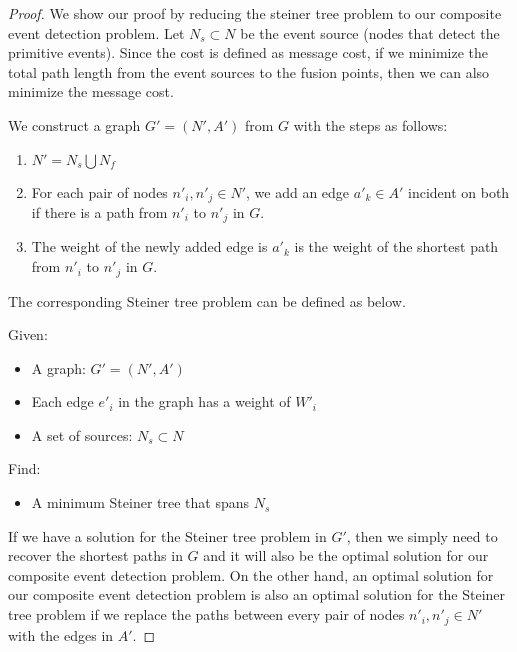 \begin{proof}
We show our proof by reducing the steiner tree problem to our composite event detection problem. Let \(N_s\subset N\) be the event source (nodes that detect the primitive events). Since the cost is defined as message cost, if we minimize the total path length from the event sources to the fusion points, then we can also minimize the message cost.

We construct a graph \(G'=(N', A')\) from \(G\) with the steps as follows:
\begin{enumerate}
\item \(N'=N_s\bigcup N_f\)
\item For each pair of nodes \(n'_i, n'_j\in N'\), we add an edge \(a'_k\in A'\) incident on both if there is a path from \(n'_i\) to \(n'_j\) in \(G\).
\item The weight of the newly added edge is \(a'_k\) is the weight of the shortest path from \(n'_i\) to \(n'_j\) in \(G\).
\end{enumerate}

The corresponding Steiner tree problem can be defined as below.

Given:
\begin{itemize}
\item A graph: \(G'=(N', A')\)
\item Each edge \(e'_i\) in the graph has a weight of \(W'_i\)
\item A set of sources: \(N_s\subset N\)
\end{itemize}

Find:
\begin{itemize}
\item A minimum Steiner tree that spans \(N_s\)
\end{itemize}

If we have a solution for the Steiner tree problem in \(G'\), then we simply need to recover the shortest paths in \(G\) and it will also be the optimal solution for our composite event detection problem. On the other hand, an optimal solution for our composite event detection problem is also an optimal solution for the Steiner tree problem if we replace the paths between every pair of nodes \(n'_i, n'_j\in N'\)  with the edges in \(A'\).
\end{proof}